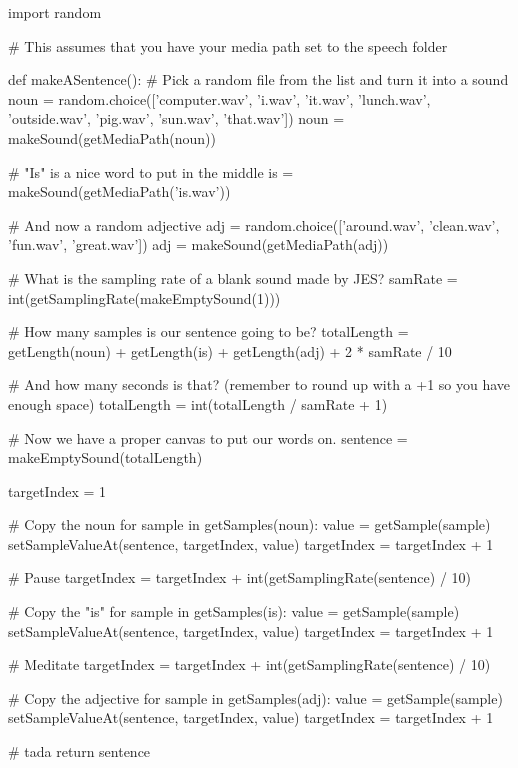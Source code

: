 \begin{exercises}
\begin{ex}
\begin{example}
import random

# This assumes that you have your media path set to the speech folder

def makeASentence():
  # Pick a random file from the list and turn it into a sound
  noun = random.choice(['computer.wav', 'i.wav', 'it.wav', 'lunch.wav',
'outside.wav', 'pig.wav', 'sun.wav', 'that.wav'])
  noun = makeSound(getMediaPath(noun))

  # "Is" is a nice word to put in the middle
  is = makeSound(getMediaPath('is.wav'))

  # And now a random adjective
  adj = random.choice(['around.wav', 'clean.wav', 'fun.wav', 'great.wav'])
  adj = makeSound(getMediaPath(adj))

  # What is the sampling rate of a blank sound made by JES?
  samRate = int(getSamplingRate(makeEmptySound(1)))

  # How many samples is our sentence going to be?
  totalLength = getLength(noun) + getLength(is) + getLength(adj) + 2 *
samRate / 10

  # And how many seconds is that? (remember to round up with a +1 so you have enough space)
  totalLength = int(totalLength / samRate + 1) 

  # Now we have a proper canvas to put our words on.
  sentence = makeEmptySound(totalLength)
	
  targetIndex = 1

  # Copy the noun
  for sample in getSamples(noun):
    value = getSample(sample)
    setSampleValueAt(sentence, targetIndex, value)
    targetIndex = targetIndex + 1

  # Pause
  targetIndex = targetIndex + int(getSamplingRate(sentence) / 10)

  # Copy the "is"
  for sample in getSamples(is):
    value = getSample(sample)
    setSampleValueAt(sentence, targetIndex, value)
    targetIndex = targetIndex + 1

  # Meditate
  targetIndex = targetIndex + int(getSamplingRate(sentence) / 10)

  # Copy the adjective
  for sample in getSamples(adj):
    value = getSample(sample)
    setSampleValueAt(sentence, targetIndex, value)
    targetIndex = targetIndex + 1

  # tada
  return sentence
\end{example}
\end{ex}


\end{exercises}
